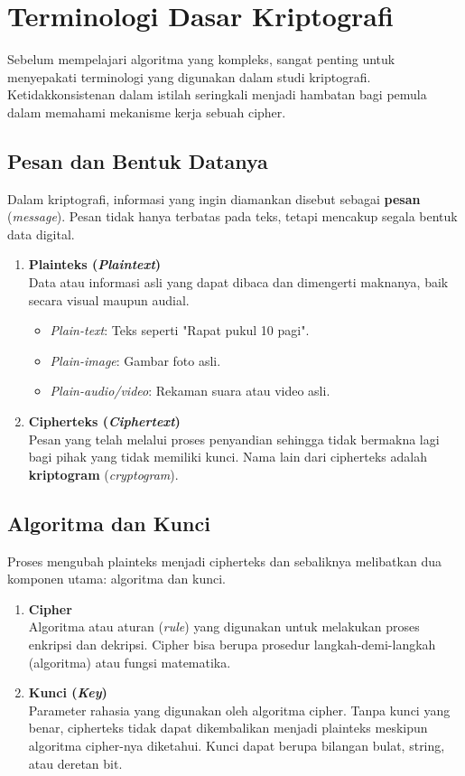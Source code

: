 \section{Terminologi Dasar Kriptografi}

Sebelum mempelajari algoritma yang kompleks, sangat penting untuk menyepakati terminologi yang digunakan dalam studi kriptografi. Ketidakkonsistenan dalam istilah seringkali menjadi hambatan bagi pemula dalam memahami mekanisme kerja sebuah cipher.

\subsection{Pesan dan Bentuk Datanya}

Dalam kriptografi, informasi yang ingin diamankan disebut sebagai \textbf{pesan} (\textit{message}). Pesan tidak hanya terbatas pada teks, tetapi mencakup segala bentuk data digital.

\begin{enumerate}
    \item \textbf{Plainteks (\textit{Plaintext})} \\
    Data atau informasi asli yang dapat dibaca dan dimengerti maknanya, baik secara visual maupun audial.
    \begin{itemize}
        \item \textit{Plain-text}: Teks seperti "Rapat pukul 10 pagi".
        \item \textit{Plain-image}: Gambar foto asli.
        \item \textit{Plain-audio/video}: Rekaman suara atau video asli.
    \end{itemize}

    \item \textbf{Cipherteks (\textit{Ciphertext})} \\
    Pesan yang telah melalui proses penyandian sehingga tidak bermakna lagi bagi pihak yang tidak memiliki kunci. Nama lain dari cipherteks adalah \textbf{kriptogram} (\textit{cryptogram}).
\end{enumerate}

\subsection{Algoritma dan Kunci}

Proses mengubah plainteks menjadi cipherteks dan sebaliknya melibatkan dua komponen utama: algoritma dan kunci.

\begin{enumerate}
    \item \textbf{Cipher} \\
    Algoritma atau aturan (\textit{rule}) yang digunakan untuk melakukan proses enkripsi dan dekripsi. Cipher bisa berupa prosedur langkah-demi-langkah (algoritma) atau fungsi matematika.
    \item \textbf{Kunci (\textit{Key})} \\
    Parameter rahasia yang digunakan oleh algoritma cipher. Tanpa kunci yang benar, cipherteks tidak dapat dikembalikan menjadi plainteks meskipun algoritma cipher-nya diketahui. Kunci dapat berupa bilangan bulat, string, atau deretan bit.
\end{enumerate}

